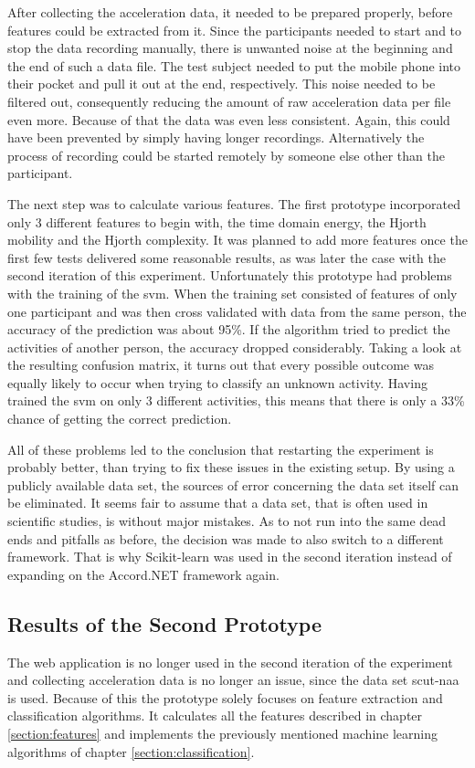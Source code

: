 After collecting the acceleration data, it needed to be prepared properly, before features could be extracted from it. Since the participants needed to start and to stop the data recording manually, there is unwanted noise at the beginning and the end of such a data file. The test subject needed to put the mobile phone into their pocket and pull it out at the end, respectively. This noise needed to be filtered out, consequently reducing the amount of raw acceleration data per file even more. Because of that the data was even less consistent. Again, this could have been prevented by simply having longer recordings. Alternatively the process of recording could be started remotely by someone else other than the participant.

The next step was to calculate various features. The first prototype incorporated only 3 different features to begin with, the time domain energy, the Hjorth mobility and the Hjorth complexity. It was planned to add more features once the first few tests delivered some reasonable results, as was later the case with the second iteration of this experiment. Unfortunately this prototype had problems with the training of the \gls{svm}. When the training set consisted of features of only one participant and was then cross validated with data from the same person, the accuracy of the prediction was about 95\%. If the algorithm tried to predict the activities of another person, the accuracy dropped considerably. Taking a look at the resulting confusion matrix, it turns out that every possible outcome was equally likely to occur when trying to classify an unknown activity. Having trained the \gls{svm} on only 3 different activities, this means that there is only a 33\% chance of getting the correct prediction.

All of these problems led to the conclusion that restarting the experiment is probably better, than trying to fix these issues in the existing setup. By using a publicly available data set, the sources of error concerning the data set itself can be eliminated. It seems fair to assume that a data set, that is often used in scientific studies, is without major mistakes. As to not run into the same dead ends and pitfalls as before, the decision was made to also switch to a different framework. That is why Scikit-learn was used in the second iteration instead of expanding on the Accord.NET framework again.




\subsection{Results of the Second Prototype}
\label{section:second-results}
The web application is no longer used in the second iteration of the experiment and collecting acceleration data is no longer an issue, since the data set \gls{scut-naa} is used. Because of this the prototype solely focuses on feature extraction and classification algorithms. It calculates all the features described in chapter \ref{section:features} and implements the previously mentioned machine learning algorithms of chapter \ref{section:classification}.

